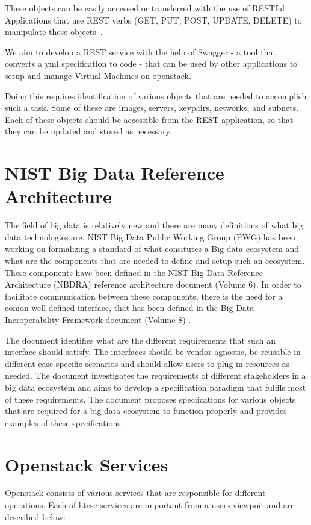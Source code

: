 These objects can be easily accessed or transferred with the use of
RESTful Applications that use REST verbs (GET, PUT, POST, UPDATE,
DELETE) to manipulate these objects~\cite{hid-sp18-503-REST}.

We aim to develop a REST service with the help of Swagger - a tool
that converts a yml specification to code - that can be used by other
applications to setup and manage Virtual Machines on openstack.

Doing this requires identification of various objects that are needed
to accomplish such a task. Some of these are images, servers,
keypairs, networks, and subnets. Each of these objects should be
accessible from the REST application, so that they can be updated and
stored as necessary.

\section{NIST Big Data Reference Architecture}
The field of big data is relatively new and there are many definitions
of what big data technologies are. NIST Big Data Public Working Group
(PWG) has been working on formalizing a standard of what consitutes a
Big data ecosystem and what are the components that are needed to
define and setup such an ecosystem. These components have been defined
in the NIST Big Data Reference Architecture (NBDRA) reference
architecture document (Volume 6). In order to facilitate communication
between these components, there is the need for a comon well defined
interface, that has been defined in the Big Data Ineroperability
Framework document (Volume 8)
\cite{hid-sp18-503-BDRA}.

The document identifies what are the different requirements that such
an interface should satisfy. The interfaces should be vendor agnostic,
be reusable in different case specific scenarios and should allow
users to plug in resources as needed. The document investigates the
requirements of different stakeholders in a big data ecosystem and
aims to develop a specification paradigm that fulfils most of these
requirements. The document proposes speciications for various objects
that are required for a big data ecosystem to function properly and
provides examples of these specifications~\cite{hid-sp18-503-BDRA}. 

\section{Openstack Services}
Openstack consists of various services that are responsible for
different operations. Each of htese services are important from a
users viewpoit and are described below:

